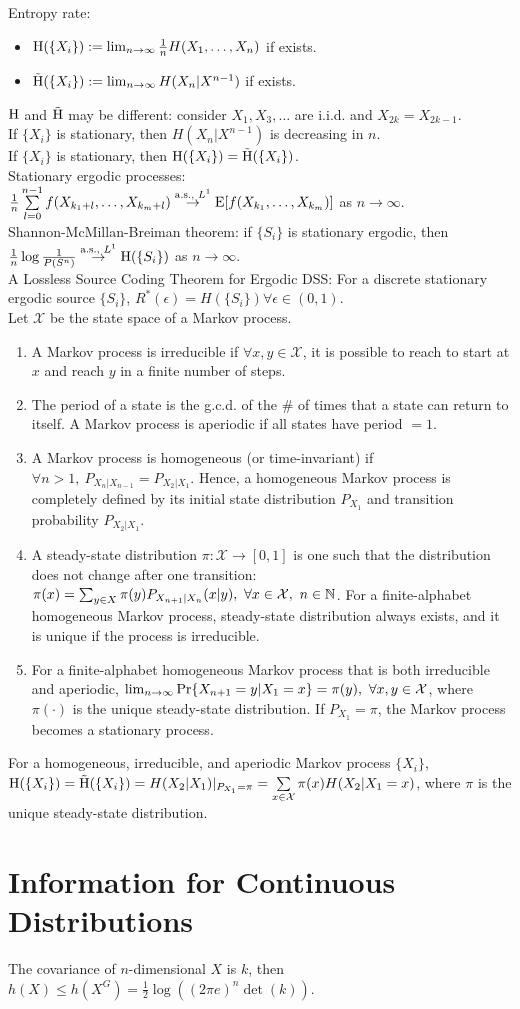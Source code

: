 Entropy rate:
\begin{itemize}
\item $\H(\{X_i\}):=\lim_{n\to\infty}\frac1nH(X_1, \dots, X_n)$ if exists.
\item $\tilde\H(\{X_i\}):=\lim_{n\to\infty}H(X_n|X^{n-1})$ if exists.
\end{itemize}
$\H$ and $\tilde\H$ may be different: consider $X_1, X_3, \dots$ are i.i.d. and $X_{2k}=X_{2k-1}$.\\
If $\{X_i\}$ is stationary, then $H(X_n|X^{n-1})$ is decreasing in $n$.\\
If $\{X_i\}$ is stationary, then $\H(\{X_i\})=\tilde\H(\{X_i\})$.\\
Stationary ergodic processes: $\frac1n\suml_{l=0}^{n-1}f(X_{k_1+l}, \dots, X_{k_m+l})\overset{\text{a.s., }L^1}\to\E[f(X_{k_1}, \dots, X_{k_m})]$ as $n\to\infty$.\\
Shannon-McMillan-Breiman theorem: if $\{S_i\}$ is stationary ergodic, then $\frac1n\log\frac1{P(S^n)}\overset{\text{a.s., }L^1}\to\H(\{S_i\})$ as $n\to\infty$.\\
A Lossless Source Coding Theorem for Ergodic DSS: For a discrete stationary ergodic source $\{S_i\}$, $R^*(\epsilon)=H(\{S_i\})\forall\epsilon\in(0, 1)$.\\
Let $\mathcal{X}$ be the state space of a Markov process.
\begin{enumerate}
\item A Markov process is irreducible if $\forall x, y\in\mathcal{X}$, it is possible to reach to start at $x$ and reach $y$ in a finite number of steps.
\item The period of a state is the g.c.d. of the \# of times that a state can return to itself. A Markov process is aperiodic if all states have period $= 1$.
\item A Markov process is homogeneous (or time-invariant) if $\forall n>1,\ P_{X_n|X_{n-1}}=P_{X_2|X_1}$. Hence, a homogeneous Markov process is completely defined by its initial state distribution $P_{X_1}$ and transition probability $P_{X_2|X_1}$.
\item A steady-state distribution $\pi:\mathcal{X}\to[0, 1]$ is one such that the distribution does not change after one transition: $\pi(x)=\sum_{y\in X}\pi(y)P_{X_{n+1}|X_n}(x|y),\ \forall x\in\mathcal{X},\ n\in\N$. For a finite-alphabet homogeneous Markov process, steady-state distribution always exists, and it is unique if the process is irreducible.
\item For a finite-alphabet homogeneous Markov process that is both irreducible and aperiodic, $\lim_{n\to\infty}\P\{X_{n+1} = y|X_1 = x\} = \pi(y),\ \forall x, y \in\mathcal{X}$, where $\pi(\cdot)$ is the unique steady-state distribution. If $P_{X_1} = \pi$, the Markov process becomes a stationary process.
\end{enumerate}
For a homogeneous, irreducible, and aperiodic Markov process $\{X_i\}$, $\H(\{X_i\})=\tilde\H(\{X_i\})=H(X_2|X_1)|_{P_{X_1}=\pi}=\suml_{x\in\mathcal{X}}\pi(x)H(X_2|X_1=x)$, where $\pi$ is the unique steady-state distribution.

\section{Information for Continuous Distributions}

The covariance of $n$-dimensional $X$ is $k$, then $h(X)\leq h(X^G)=\frac12\log((2\pi e)^n\det(k))$.
